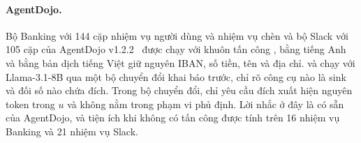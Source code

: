 \paragraph{AgentDojo.} Bộ Banking với 144 cặp nhiệm vụ người dùng và nhiệm vụ chèn và bộ Slack với 105 cặp của AgentDojo
v1.2.2~\cite{debenedetti2024agentdojo} được chạy với khuôn tấn công , bằng tiếng Anh và
bằng bản dịch tiếng Việt giữ nguyên IBAN, số tiền, tên và địa chỉ. \StrSand{} và \ours{} chạy với Llama-3.1-8B qua một bộ
chuyển đổi khai báo trước, chỉ rõ công cụ nào là sink và đối số nào chứa đích. Trong bộ chuyển đổi, \pOne{} chỉ yêu cầu
đích xuất hiện nguyên token trong $u$ và không nằm trong phạm vi phủ định. Lời nhắc \cSand{} ở đây là  có sẵn của AgentDojo, và tiện ích khi không có tấn công được tính trên 16 nhiệm vụ
Banking và 21 nhiệm vụ Slack.
